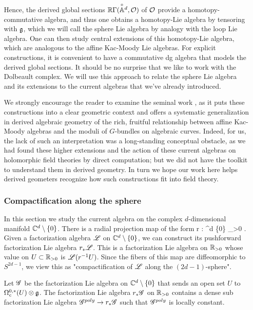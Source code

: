 Hence, the derived global sections $\mathbb R\Gamma(\overset{\circ}{\mathbb A}{}^d,\mathcal O)$ of $\mathcal O$ provide a homotopy-commutative algebra,
and thus one obtains a homotopy-Lie algebra by tensoring with $\mathfrak g$,
which we will call the sphere Lie algebra by analogy with the loop Lie algebra.
One can then study central extensions of this homotopy-Lie algebra,
which are analogous to the affine Kac-Moody Lie algebras.
For explicit constructions, it is convenient to have a commutative dg algebra that models the derived global sections.
It should be no surprise that we like to work with the Dolbeault complex.
We will use this approach to relate the sphere Lie algebra and its extensions to the current algebras that we've already introduced.

\begin{rmk}
We strongly encourage the reader to examine the seminal work \cite{FHK},
as it puts these constructions into a clear geometric context and offers a systematic generalization in derived algebraic geometry of the rich, fruitful relationship between affine Kac-Moody algebras and the moduli of $G$-bundles on algebraic curves.
Indeed, for us, the lack of such an interpretation was a long-standing conceptual obstacle,
as we had found these higher extensions and the action of these current algebras on holomorphic field theories by direct computation;
but we did not have the toolkit to understand them in derived geometry.
In turn we hope our work here helps derived geometers recognize how such constructions fit into field theory.
\end{rmk}

\subsubsection{Compactification along the sphere}

In this section we study the current algebra on the complex $d$-dimensional manifold $\mathbb C^d \setminus \{0\}$. 
There is a radial projection map of the form
\ben
r : \CC^d \setminus \{0\} \to \RR_{>0} .
\een 
Given a factorization algebra $\mathscr L$ on $\mathbb C^d \setminus \{0\}$, we can construct its pushforward factorization Lie algebra $r_*\mathscr L$. 
This is a factorization Lie algebra on $\mathbb R_{>0}$ whose value on $U \subset \mathbb R_{>0}$ is $\mathscr L(r^{-1}U)$. 
Since the fibers of this map are diffeomorphic to $S^{2d-1}$, we view this as "compactification of $\mathscr L$ along the $(2d-1)$-sphere". 

\begin{lem}
Let $\mathscr G$ be the factorization Lie algebra on $\mathbb C^d \setminus \{0\}$ that sends an open set $U$ to $\Omega^{0,*}_c(U) \otimes \mathfrak g$. 
The factorization Lie algebra $r_*\mathscr G$ on $\mathbb R_{>0}$ contains a dense sub factorization Lie algebra $\mathscr G^{poly} \to r_*\mathscr G$ such that $\mathscr G^{poly}$ is locally constant.
\end{lem}

